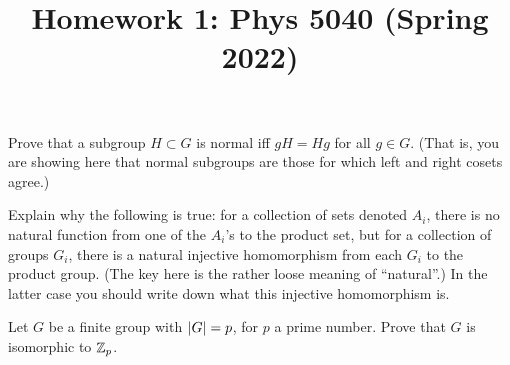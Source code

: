 \documentclass[12pt]{article}
\title{Homework 1: Phys 5040 (Spring 2022)}
\begin{document}
\maketitle
\begin{problem}{1}
Prove that a subgroup $H\subset G$ is normal iff $gH=Hg$ for all $g\in G$. (That
is, you are showing here that normal subgroups are those for which left and
right cosets agree.)
\begin{solution}
\end{solution}
\end{problem}
\begin{problem}{2}
Explain why the following is true: for a collection of sets denoted $A_i$, there
is no natural function from one of the $A_i$'s to the product set, but for a
collection of groups $G_i$, there is a natural injective homomorphism from each
$G_i$ to the product group. (The key here is the rather loose meaning of
``natural''.) In the latter case you should write down what this injective
homomorphism is.
\begin{solution}
\end{solution}
\end{problem}
\begin{problem}{3}
Let $G$ be a finite group with $\abs{G}=p$, for $p$ a prime number. Prove that
$G$ is isomorphic to $\mathbb{Z}_p$.
\begin{solution}
\end{solution}
\end{problem}
\end{document}
